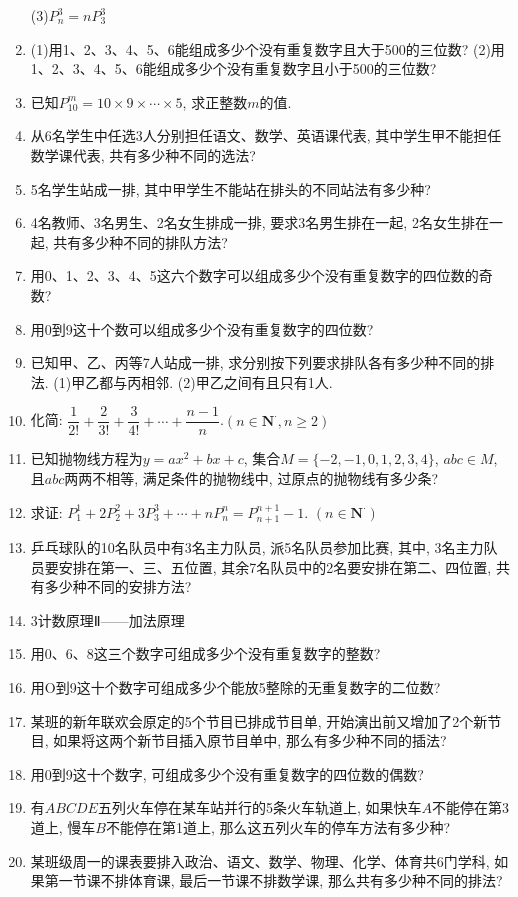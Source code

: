 \documentclass[10pt,a4paper]{article}
\begin{document}
\begin{enumerate}[1.]
(3)$P_n^3=nP_3^3$
\item (1)用1、2、3、4、5、6能组成多少个没有重复数字且大于500的三位数?
(2)用1、2、3、4、5、6能组成多少个没有重复数字且小于500的三位数?
\item 已知$P_{10}^m=10\times 9\times \cdots \times 5$, 求正整数$m$的值.
\item 从6名学生中任选3人分别担任语文、数学、英语课代表, 其中学生甲不能担任数学课代表, 共有多少种不同的选法?
\item 5名学生站成一排, 其中甲学生不能站在排头的不同站法有多少种?
\item 4名教师、3名男生、2名女生排成一排, 要求3名男生排在一起, 2名女生排在一起, 共有多少种不同的排队方法?
\item 用0、1、2、3、4、5这六个数字可以组成多少个没有重复数字的四位数的奇数?
\item 用0到9这十个数可以组成多少个没有重复数字的四位数?
\item 已知甲、乙、丙等7人站成一排, 求分别按下列要求排队各有多少种不同的排法.
(1)甲乙都与丙相邻.
(2)甲乙之间有且只有1人.
\item 化简: $\dfrac 1{2!}+\dfrac 2{3!}+\dfrac 3{4!}+\cdots +\dfrac{n-1}n$.$(n\in \mathbf{N}^{\cdot },n\ge 2)$
\item 已知抛物线方程为$y=ax^2+bx+c$, 集合$M=\{-2,-1,0,1,2,3,4\}$, $abc\in M$, 且$abc$两两不相等, 满足条件的抛物线中, 过原点的抛物线有多少条?
\item 求证: $P_1^1+2P_2^2+3P_3^3+\cdots +nP_n^n=P_{n+1}^{n+1}-1$. $(n\in \mathbf{N}^{\cdot })$
\item 乒乓球队的10名队员中有3名主力队员, 派5名队员参加比赛, 其中, 3名主力队员要安排在第一、三、五位置, 其余7名队员中的2名要安排在第二、四位置, 共有多少种不同的安排方法?
\item 3计数原理Ⅱ——加法原理
\item 用0、6、8这三个数字可组成多少个没有重复数字的整数?
\item 用O到9这十个数字可组成多少个能放5整除的无重复数字的二位数?
\item 某班的新年联欢会原定的5个节目已排成节目单, 开始演出前又增加了2个新节目, 如果将这两个新节目插入原节目单中, 那么有多少种不同的插法?
\item 用0到9这十个数字, 可组成多少个没有重复数字的四位数的偶数?
\item 有$ABCDE$五列火车停在某车站并行的5条火车轨道上, 如果快车$A$不能停在第3道上, 慢车$B$不能停在第1道上, 那么这五列火车的停车方法有多少种?
\item 某班级周一的课表要排入政治、语文、数学、物理、化学、体育共6门学科, 如果第一节课不排体育课, 最后一节课不排数学课, 那么共有多少种不同的排法?

\end{enumerate}
\end{document}
